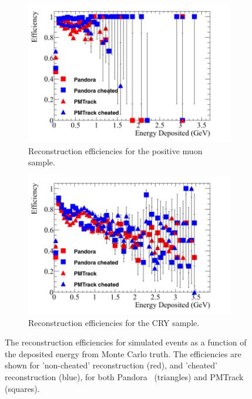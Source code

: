 \begin{figure}
  \centering
  \begin{subfigure}{0.48\textwidth}
    \centering
    \includegraphics[width=\textwidth]{Effic_AntiMuon_500V_All_EnDepos}
    \caption{Reconstruction efficiencies for the positive muon sample.}
    \label{fig:SimEffic_EnDepos_AMu}
  \end{subfigure}%
  \hspace{0.03\textwidth}%
  \begin{subfigure}{0.48\textwidth}
    \centering
    \includegraphics[width=\textwidth]{Effic_Cosmics_500V_All_EnDepos}
    \caption{Reconstruction efficiencies for the CRY sample.}
    \label{fig:SimEffic_EnDepos_CRY}
  \end{subfigure}
  \caption[The reconstruction efficiencies for simulated events as a function of the deposited energy from Monte Carlo truth.]
          {The reconstruction efficiencies for simulated events as a function of the deposited energy from Monte Carlo truth. The efficiencies are shown for 'non-cheated' reconstruction (red), and 'cheated' reconstruction (blue), for both Pandora~\citep{Pandora} (triangles) and PMTrack~\citep{PMTrack} (squares).}
          \label{fig:SimEffic_EnDepos}
\end{figure}

